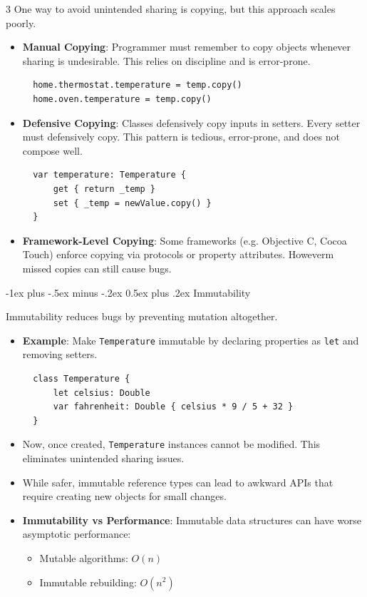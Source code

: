 \documentclass[a4paper, 9pt, landscape]{extarticle}
\makeatletter
\renewcommand{\subsection}{\@startsection{subsubsection}{3}{0mm}%
                                {-1ex plus -.5ex minus -.2ex}%
                                {0.5ex plus .2ex}%
                                {\normalfont\small\bfseries}}
\makeatother
\begin{document}
\begin{multicols*}{3}
One way to avoid unintended sharing is copying, but this approach scales poorly.
\begin{itemize}
  \item \textbf{Manual Copying}: Programmer must remember to copy objects whenever sharing is undesirable. This relies on discipline and is error-prone.
  \begin{verbatim}
  home.thermostat.temperature = temp.copy()
  home.oven.temperature = temp.copy()
  \end{verbatim}
  \item \textbf{Defensive Copying}: Classes defensively copy inputs in setters. Every setter must defensively copy. This pattern is tedious, error-prone, and does not compose well.
  \begin{verbatim}
  var temperature: Temperature {
      get { return _temp }
      set { _temp = newValue.copy() }
  }
  \end{verbatim}
  \item \textbf{Framework-Level Copying}: Some frameworks (e.g. Objective C, Cocoa Touch) enforce copying via protocols or property attributes. Howeverm missed copies can still cause bugs.
\end{itemize}

\subsection{Immutability}

Immutability reduces bugs by preventing mutation altogether.
\begin{itemize}
  \item \textbf{Example}: Make \texttt{Temperature} immutable by declaring properties as \texttt{let} and removing setters.
  \begin{verbatim}
  class Temperature {
      let celsius: Double
      var fahrenheit: Double { celsius * 9 / 5 + 32 }
  }
  \end{verbatim}
  \item Now, once created, \texttt{Temperature} instances cannot be modified. This eliminates unintended sharing issues.
  \item While safer, immutable reference types can lead to awkward APIs that require creating new objects for small changes.
  \item \textbf{Immutability vs Performance}: Immutable data structures can have worse asymptotic performance:
    \begin{itemize}
        \item Mutable algorithms: $O(n)$
        \item Immutable rebuilding: $O(n^2)$
    \end{itemize}
\end{itemize}




\end{multicols*}
\end{document}
